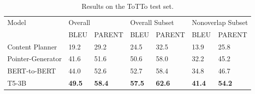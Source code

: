 \documentclass[11pt,a4paper]{article}
\begin{document}
\begin{table*}[h]
\centering
\begin{tabular}{lllllll}
\hline
\multirow{2}{*}{Model} &  \multicolumn{2}{l}{Overall} & \multicolumn{2}{l}{Overall Subset} & \multicolumn{2}{l}{Nonoverlap Subset} \\
                  & BLEU        & PARENT        & BLEU            & PARENT           & BLEU             & PARENT             \\ \hline
Content Planner   & 19.2        & 29.2          & 24.5            & 32.5             & 13.9             & 25.8               \\
Pointer-Generator & 41.6        & 51.6          & 50.6            & 58.0             & 32.2             & 45.2               \\
BERT-to-BERT      & 44.0        & 52.6          & 52.7            & 58.4             & 34.8             & 46.7               \\
T5-3B             & \textbf{49.5}        & \textbf{58.4}          & \textbf{57.5}            & \textbf{62.6}             & \textbf{41.4}             & \textbf{54.2}               \\ \hline
\end{tabular}
\caption{Results on the ToTTo test set.}
\label{results-totto}
\end{table*}
\end{document}
